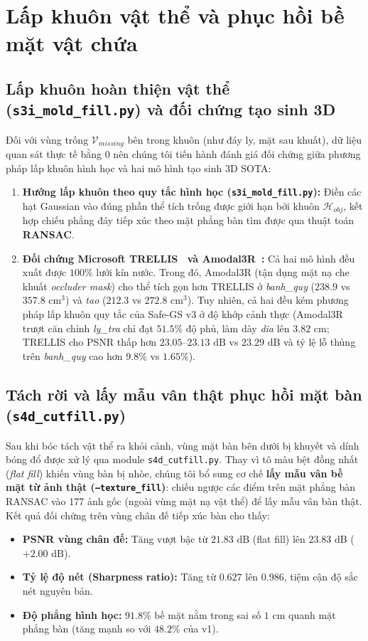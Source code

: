 \section{Lấp khuôn vật thể và phục hồi bề mặt vật chứa}
\subsection{Lấp khuôn hoàn thiện vật thể (\texttt{s3i\_mold\_fill.py}) và đối chứng tạo sinh 3D}
Đối với vùng trống $\mathcal{V}_{missing}$ bên trong khuôn (như đáy ly, mặt sau khuất), dữ liệu quan sát thực tế bằng 0 nên chúng tôi tiến hành đánh giá đối chứng giữa phương pháp lấp khuôn hình học và hai mô hình tạo sinh 3D SOTA:
\begin{enumerate}
    \item \textbf{Hướng lấp khuôn theo quy tắc hình học (\texttt{s3i\_mold\_fill.py}):} Điền các hạt Gaussian vào đúng phần thể tích trống được giới hạn bởi khuôn $\mathcal{H}_{obj}$, kết hợp chiếu phẳng đáy tiếp xúc theo mặt phẳng bàn tìm được qua thuật toán \textbf{RANSAC}.
    \item \textbf{Đối chứng Microsoft TRELLIS~\cite{xiang2024trellis} và Amodal3R~\cite{amodal3r_2025}:} Cả hai mô hình đều xuất được $100\%$ lưới kín nước. Trong đó, Amodal3R (tận dụng mặt nạ che khuất \textit{occluder mask}) cho thể tích gọn hơn TRELLIS ở \textit{banh\_quy} ($238.9$ vs $357.8\text{ cm}^3$) và \textit{tao} ($212.3$ vs $272.8\text{ cm}^3$). Tuy nhiên, cả hai đều kém phương pháp lấp khuôn quy tắc của Safe-GS v3 ở độ khớp cảnh thực (Amodal3R trượt căn chỉnh \textit{ly\_tra} chỉ đạt $51.5\%$ độ phủ, làm dày \textit{dia} lên $3.82\text{ cm}$; TRELLIS cho PSNR thấp hơn $23.05\text{--}23.13\text{ dB}$ vs $23.29\text{ dB}$ và tỷ lệ lỗ thủng trên \textit{banh\_quy} cao hơn $9.8\%$ vs $1.65\%$).
\end{enumerate}

\subsection{Tách rời và lấy mẫu vân thật phục hồi mặt bàn (\texttt{s4d\_cutfill.py})}
Sau khi bóc tách vật thể ra khỏi cảnh, vùng mặt bàn bên dưới bị khuyết và dính bóng đổ được xử lý qua module \texttt{s4d\_cutfill.py}. Thay vì tô màu bệt đồng nhất (\textit{flat fill}) khiến vùng bàn bị nhòe, chúng tôi bổ sung cơ chế \textbf{lấy mẫu vân bề mặt từ ảnh thật (\texttt{--texture\_fill})}: chiếu ngược các điểm trên mặt phẳng bàn RANSAC vào 177 ảnh gốc (ngoài vùng mặt nạ vật thể) để lấy mẫu vân bàn thật. Kết quả đối chứng trên vùng chân đế tiếp xúc bàn cho thấy:
\begin{itemize}
    \item \textbf{PSNR vùng chân đế:} Tăng vượt bậc từ $21.83\text{ dB}$ (flat fill) lên \textbf{$23.83\text{ dB}$} ($+2.00\text{ dB}$).
    \item \textbf{Tỷ lệ độ nét (Sharpness ratio):} Tăng từ $0.627$ lên \textbf{$0.986$}, tiệm cận độ sắc nét nguyên bản.
    \item \textbf{Độ phẳng hình học:} \textbf{$91.8\%$} bề mặt nằm trong sai số $1\text{ cm}$ quanh mặt phẳng bàn (tăng mạnh so với $48.2\%$ của v1).
\end{itemize}
